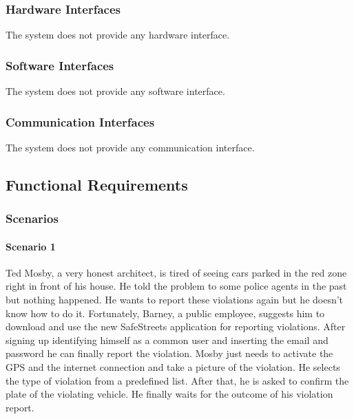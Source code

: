 \documentclass[a4paper]{article}
\begin{document}
\newpage

\subsubsection{Hardware Interfaces}

The system does not provide any hardware interface.

\subsubsection{Software Interfaces}

The system does not provide any software interface.

\subsubsection{Communication Interfaces}

The system does not provide any communication interface.

\subsection{Functional Requirements}

\subsubsection{Scenarios}

\paragraph{Scenario 1}
Ted Mosby, a very honest architect, is tired of seeing cars parked in
the red zone right in front of his house. He told the problem to some
police agents in the past but nothing happened. He wants to report these
violations again but he doesn't know how to do it. Fortunately, Barney,
a public employee, suggests him to download and use the new SafeStreets
application for reporting violations. After signing up identifying
himself as a common user and inserting the email and password he can
finally report the violation. Mosby just needs to activate the GPS and
the internet connection and take a picture of the violation. He selects
the type of violation from a predefined list. After that, he is asked to
confirm the plate of the violating vehicle. He finally waits for the
outcome of his violation report.
\end{document}
